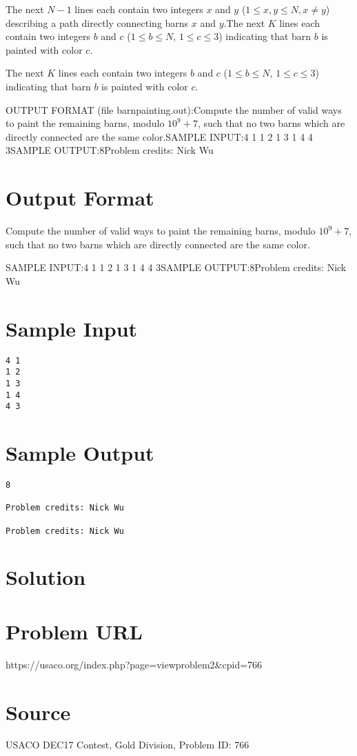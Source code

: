 \documentclass[12pt]{article}
\begin{document}
The next $N-1$ lines each contain two integers $x$ and $y$ 
($1 \le x, y \le N, x \neq y$) describing a path directly connecting barns $x$
and $y$.The next $K$ lines each contain two integers $b$ and $c$ ($1 \le b \le N$,
$1 \le c \le 3$) indicating that barn $b$ is painted with color $c$.

The next $K$ lines each contain two integers $b$ and $c$ ($1 \le b \le N$,
$1 \le c \le 3$) indicating that barn $b$ is painted with color $c$.

OUTPUT FORMAT (file barnpainting.out):Compute the number of valid ways to paint the remaining barns, modulo
$10^9 + 7$, such that no two barns which are directly connected are the same
color.SAMPLE INPUT:4 1
1 2
1 3
1 4
4 3SAMPLE OUTPUT:8Problem credits: Nick Wu

\section*{Output Format}
Compute the number of valid ways to paint the remaining barns, modulo
$10^9 + 7$, such that no two barns which are directly connected are the same
color.

SAMPLE INPUT:4 1
1 2
1 3
1 4
4 3SAMPLE OUTPUT:8Problem credits: Nick Wu

\section*{Sample Input}
\begin{verbatim}
4 1
1 2
1 3
1 4
4 3
\end{verbatim}

\section*{Sample Output}
\begin{verbatim}
8

Problem credits: Nick Wu

Problem credits: Nick Wu
\end{verbatim}

\section*{Solution}


\section*{Problem URL}
https://usaco.org/index.php?page=viewproblem2&cpid=766

\section*{Source}
USACO DEC17 Contest, Gold Division, Problem ID: 766
\end{document}
